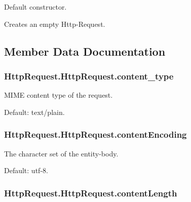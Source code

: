 Default constructor. 

Creates an empty Http-\/\-Request. 

\subsection{Member Data Documentation}
\hypertarget{class_http_request_1_1_http_request_a588d3bb83d3d30c0de69c7175d9500ba}{
\subsubsection[{content\-\_\-type}]{\setlength{\rightskip}{0pt plus 5cm}Http\-Request.\-Http\-Request.\-content\-\_\-type}}\label{class_http_request_1_1_http_request_a588d3bb83d3d30c0de69c7175d9500ba}


M\-I\-M\-E content type of the request. 

Default\-: text/plain. \hypertarget{class_http_request_1_1_http_request_a37deed6d8791b240c1db458c0f3eb95d}{
\subsubsection[{content\-Encoding}]{\setlength{\rightskip}{0pt plus 5cm}Http\-Request.\-Http\-Request.\-content\-Encoding}}\label{class_http_request_1_1_http_request_a37deed6d8791b240c1db458c0f3eb95d}


The character set of the entity-\/body. 

Default\-: utf-\/8. \hypertarget{class_http_request_1_1_http_request_aa37faef2bdb70d29c6ce741d7362dad4}{
\subsubsection[{content\-Length}]{\setlength{\rightskip}{0pt plus 5cm}Http\-Request.\-Http\-Request.\-content\-Length}}\label{class_http_request_1_1_http_request_aa37faef2bdb70d29c6ce741d7362dad4}


